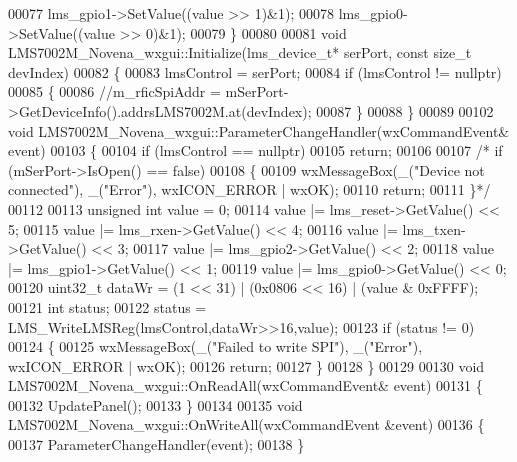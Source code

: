 \begin{DoxyCode}
00077     lms_gpio1->SetValue((value >> 1)&1);
00078     lms_gpio0->SetValue((value >> 0)&1);
00079 \}
00080 
00081 \textcolor{keywordtype}{void} LMS7002M_Novena_wxgui::Initialize(lms_device_t* serPort, \textcolor{keyword}{const} \textcolor{keywordtype}{size\_t} devIndex)
00082 \{
00083    lmsControl = serPort;
00084     \textcolor{keywordflow}{if} (lmsControl != \textcolor{keyword}{nullptr})
00085     \{
00086         \textcolor{comment}{//m\_rficSpiAddr = mSerPort->GetDeviceInfo().addrsLMS7002M.at(devIndex);}
00087     \}
00088 \}
00089 
00102 \textcolor{keywordtype}{void} LMS7002M_Novena_wxgui::ParameterChangeHandler(wxCommandEvent& event)
00103 \{
00104     \textcolor{keywordflow}{if} (lmsControl == \textcolor{keyword}{nullptr})
00105         \textcolor{keywordflow}{return};
00106 
00107  \textcolor{comment}{/*   if (mSerPort->IsOpen() == false)}
00108 \textcolor{comment}{    \{}
00109 \textcolor{comment}{        wxMessageBox(\_("Device not connected"), \_("Error"), wxICON\_ERROR | wxOK);}
00110 \textcolor{comment}{        return;}
00111 \textcolor{comment}{    \}*/}
00112 
00113     \textcolor{keywordtype}{unsigned} \textcolor{keywordtype}{int} value = 0;
00114     value |= lms_reset->GetValue() << 5;
00115     value |= lms_rxen->GetValue() << 4;
00116     value |= lms_txen->GetValue() << 3;
00117     value |= lms_gpio2->GetValue() << 2;
00118     value |= lms_gpio1->GetValue() << 1;
00119     value |= lms_gpio0->GetValue() << 0;
00120     uint32\_t dataWr = (1 << 31) | (0x0806 << 16) | (value & 0xFFFF);
00121     \textcolor{keywordtype}{int} status;
00122     status = LMS_WriteLMSReg(lmsControl,dataWr>>16,value);
00123     \textcolor{keywordflow}{if} (status != 0)
00124     \{
00125         wxMessageBox(\_(\textcolor{stringliteral}{"Failed to write SPI"}), \_(\textcolor{stringliteral}{"Error"}), wxICON\_ERROR | wxOK);
00126         \textcolor{keywordflow}{return};
00127     \}
00128 \}
00129 
00130 \textcolor{keywordtype}{void} LMS7002M_Novena_wxgui::OnReadAll(wxCommandEvent& event)
00131 \{
00132     UpdatePanel();
00133 \}
00134 
00135 \textcolor{keywordtype}{void} LMS7002M_Novena_wxgui::OnWriteAll(wxCommandEvent &event)
00136 \{
00137     ParameterChangeHandler(event);
00138 \}
\end{DoxyCode}
